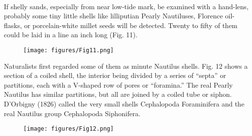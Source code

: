 \documentclass[a4paper, 12pt, oneside]{article}
\begin{document}
\paragraph{}
If shelly sands, especially from near low-tide mark, be examined with a hand-lens, probably some tiny little shells like lilliputian Pearly Nautiluses, Florence oil-flasks, or porcelain-white millet seeds will be detected. Twenty to fifty of them could be laid in a line an inch long (Fig. 11).
\begin{figure}[H]
\centering
\texttt{[image: figures/Fig11.png]}
\caption*{}
\end{figure}
Naturalists first regarded some of them as minute Nautilus shells. Fig. 12 shows a section of a coiled shell, the interior being divided by a series of ``septa'' or partitions, each with a V-shaped row of pores or ``foramina.'' The real Pearly Nautilus has similar partitions, but all are joined by a coiled tube or siphon. D'Orbigny (1826) called the very small shells Cephalopoda Foraminifera and the real Nautilus group Cephalopoda Siphonifera.
\begin{figure}[H]
\centering
\texttt{[image: figures/Fig12.png]}
\caption*{}
\end{figure}
\end{document}
